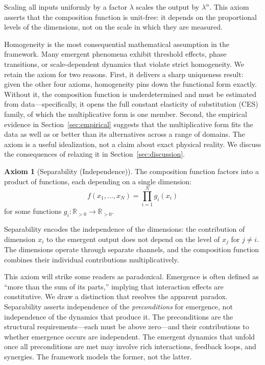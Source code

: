 \documentclass[12pt, a4paper]{article}
\theoremstyle{definition}
\newtheorem{axiom}{Axiom}
\theoremstyle{remark}
\newcommand{\Rp}{\mathbb{R}_{>0}}
\begin{document}
\noindent Scaling all inputs uniformly by a factor $\lambda$ scales the output by $\lambda^\alpha$. This axiom asserts that the composition function is unit-free: it depends on the proportional levels of the dimensions, not on the scale in which they are measured.

Homogeneity is the most consequential mathematical assumption in the framework. Many emergent phenomena exhibit threshold effects, phase transitions, or scale-dependent dynamics that violate strict homogeneity. We retain the axiom for two reasons. First, it delivers a sharp uniqueness result: given the other four axioms, homogeneity pins down the functional form exactly. Without it, the composition function is underdetermined and must be estimated from data---specifically, it opens the full constant elasticity of substitution (CES) family, of which the multiplicative form is one member. Second, the empirical evidence in Section~\ref{sec:empirical} suggests that the multiplicative form fits the data as well as or better than its alternatives across a range of domains. The axiom is a useful idealization, not a claim about exact physical reality. We discuss the consequences of relaxing it in Section~\ref{sec:discussion}.

\begin{axiom}[Separability (Independence)]\label{ax:sep}
The composition function factors into a product of functions, each depending on a single dimension:
\[
f(x_1, \ldots, x_N) = \prod_{i=1}^{N} g_i(x_i)
\]
for some functions $g_i : \Rp \to \Rp$.
\end{axiom}

\noindent Separability encodes the independence of the dimensions: the contribution of dimension $x_i$ to the emergent output does not depend on the level of $x_j$ for $j \neq i$. The dimensions operate through separate channels, and the composition function combines their individual contributions multiplicatively.

This axiom will strike some readers as paradoxical. Emergence is often defined as ``more than the sum of its parts,'' implying that interaction effects are constitutive. We draw a distinction that resolves the apparent paradox. Separability asserts independence of the \textit{preconditions} for emergence, not independence of the dynamics that produce it. The preconditions are the structural requirements---each must be above zero---and their contributions to whether emergence occurs are independent. The emergent dynamics that unfold once all preconditions are met may involve rich interactions, feedback loops, and synergies. The framework models the former, not the latter.
\end{document}
